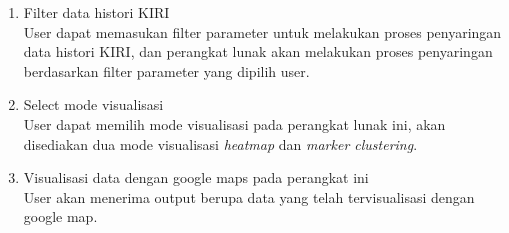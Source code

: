 \begin{enumerate}
  \item Filter data histori KIRI \\
  User dapat memasukan filter parameter untuk melakukan proses penyaringan data histori KIRI, dan perangkat lunak akan melakukan proses penyaringan berdasarkan filter parameter yang dipilih user.
  \item Select mode visualisasi \\
  User dapat memilih mode visualisasi pada perangkat lunak ini, akan disediakan dua mode visualisasi \textit{heatmap} dan \textit{marker clustering}.
  \item Visualisasi data dengan google maps pada perangkat ini \\
  User akan menerima output berupa data yang telah tervisualisasi dengan google map.
\end{enumerate}

